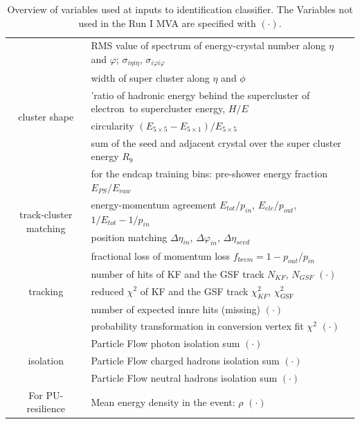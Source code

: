 \begin{table}[h!]
\begin{tabular}{c|l}
\multirow{6}{*}{cluster shape}
	&  RMS value of spectrum of energy-crystal number along $\eta$ and $\varphi$; $\sigma_{i\eta i\eta}$, $\sigma_{i\varphi i\varphi}$		\\
	&  width of super cluster along $\eta$ and $\phi$		\\
	&  'ratio of hadronic energy behind the supercluster of electron to supercluster energy, $H/E$			\\
	&  circularity $(E_{5\times5} - E_{5\times1})/E_{5\times5}$			\\
	&  sum of the seed and adjacent crystal over the super cluster energy $R_{9}$			\\
	&  for the endcap training bins: pre-shower energy fraction $E_{PS}/E_{raw}$			\\
\hline
\multirow{2}{*}{track-cluster matching}
	& energy-momentum agreement $E_{tot}/p_{in}$, $E_{ele}/p_{out}$, $1/E_{tot} - 1/p_{in}$ 			\\
	& position matching $\Delta\eta_{in}$, $\Delta\varphi_{in}$, $\Delta\eta_{seed}$			\\
\hline
\multirow{5}{*}{tracking}
        & fractional loss of momentum loss $f_{brem} = 1 - p_{out}/p_{in}$	\\
        & number of hits of KF and the GSF track $N_{KF}$, $N_{GSF}$ $(\mathord{\cdot})$ \\
        & reduced $\chi^2$ of KF and the GSF track $\chi^{2}_{KF}$, $\chi^{2}_{\textrm{GSF}}$ \\
	    & number of expected innre hits (missing) $(\mathord{\cdot})$ 	\\
        & probability transformation in conversion vertex fit $\chi^2$ $(\mathord{\cdot})$ \\
\hline
\multirow{3}{*}{isolation}
& Particle Flow photon isolation sum $(\mathord{\cdot})$ \\
& Particle Flow charged hadrons isolation sum $(\mathord{\cdot})$ \\
& Particle Flow neutral hadrons isolation sum $(\mathord{\cdot})$ \\
\hline
\multirow{1}{*}{For PU-resilience}
& Mean energy density in the event: $\rho$ $(\mathord{\cdot})$ \\
\hline %
\hline %
     \end{tabular}
\small
    \caption{Overview of variables used at inputs to identification classifier. The Variables not used in the Run I MVA are specified with  $(\mathord{\cdot})$.}
    \label{tab:ele_ID_input_variables}
\end{table}

